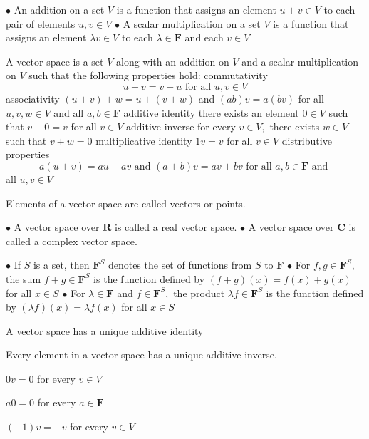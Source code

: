 
$\bullet$ An addition on a set $V$ is a function that assigns an element $u+v \in V$
to each pair of elements $u, v \in V$
$\bullet$ A scalar multiplication on a set $V$ is a function that assigns an element $\lambda v \in V$ to each $\lambda \in \mathbf{F}$ and each $v \in V$

A vector space is a set $V$ along with an addition on $V$ and a scalar multiplication on $V$ such that the following properties hold:
commutativity
$$
u+v=v+u \text { for all } u, v \in V
$$
associativity $(u+v)+w=u+(v+w)$ and $(a b) v=a(b v)$ for all $u, v, w \in V 
\text { and all } a, b \in \mathbf{F}
$
additive identity there exists an element $0 \in V$ such that $v+0=v$ for all $v \in V$
additive inverse
for every $v \in V,$ there exists $w \in V$ such that $v+w=0$
multiplicative identity
$1 v=v$ for all $v \in V$
distributive properties
$$
a(u+v)=a u+a v \text { and }(a+b) v=a v+b v \text { for all } a, b \in \mathbf{F} \text { and }
$$
all $u, v \in V$

Elements of a vector space are called vectors or points.

$\bullet$ A vector space over $\mathbf{R}$ is called a real vector space.
$\bullet$ A vector space over $\mathbf{C}$ is called a complex vector space.

$\bullet$ If $S$ is a set, then $\mathbf{F}^{S}$ denotes the set of functions from $S$ to $\mathbf{F}$
$\bullet$ For $f, g \in \mathbf{F}^{S},$ the sum $f+g \in \mathbf{F}^{S}$ is the function defined by
$
(f+g)(x)=f(x)+g(x)
$
for all $x \in S$
$\bullet$ For $\lambda \in \mathbf{F}$ and $f \in \mathbf{F}^{S},$ the product $\lambda f \in \mathbf{F}^{S}$ is the function defined by
$
(\lambda f)(x)=\lambda f(x)
$
for all $x \in S$

A vector space has a unique additive identity

Every element in a vector space has a unique additive inverse.

$0 v=0$ for every $v \in V$

$a 0=0$ for every $a \in \mathbf{F}$

$(-1) v=-v$ for every $v \in V$